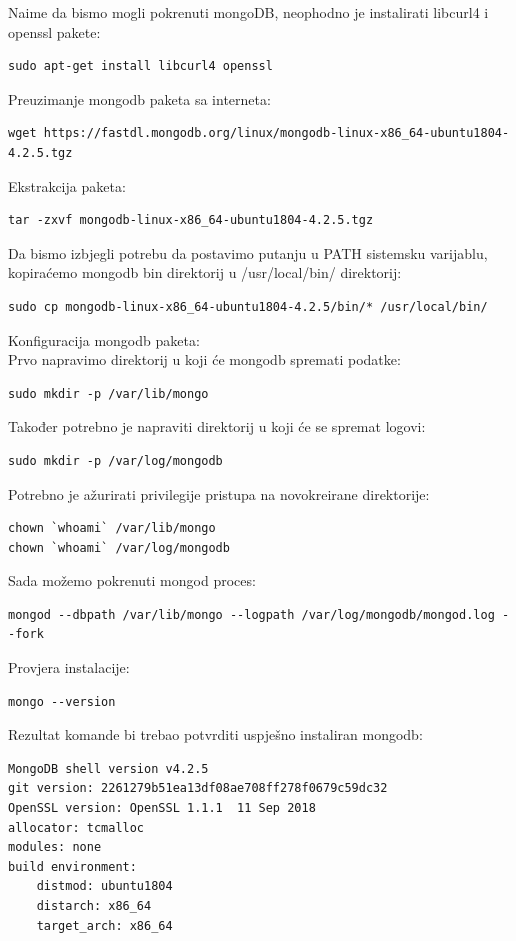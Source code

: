 \documentclass[12pt,vi]{mitthesis}
\begin{document}
\noindent
Naime da bismo mogli pokrenuti mongoDB, neophodno je instalirati libcurl4 i openssl pakete:
\begin{lstlisting}[style=BashInputStyle]
sudo apt-get install libcurl4 openssl
\end{lstlisting}
Preuzimanje mongodb paketa sa interneta:
\begin{lstlisting}[style=BashInputStyle]
wget https://fastdl.mongodb.org/linux/mongodb-linux-x86_64-ubuntu1804-4.2.5.tgz
\end{lstlisting}
Ekstrakcija paketa:
\begin{lstlisting}[style=BashInputStyle]
tar -zxvf mongodb-linux-x86_64-ubuntu1804-4.2.5.tgz
\end{lstlisting}
Da bismo izbjegli potrebu da postavimo putanju u PATH sistemsku varijablu, kopiraćemo mongodb bin direktorij u /usr/local/bin/ direktorij:
\begin{lstlisting}[style=BashInputStyle]
sudo cp mongodb-linux-x86_64-ubuntu1804-4.2.5/bin/* /usr/local/bin/
\end{lstlisting}
Konfiguracija mongodb paketa:\\
Prvo napravimo direktorij u koji će mongodb spremati podatke:
\begin{lstlisting}[style=BashInputStyle]
sudo mkdir -p /var/lib/mongo
\end{lstlisting}
Također potrebno je napraviti direktorij u koji će se spremat logovi:
\begin{lstlisting}[style=BashInputStyle]
sudo mkdir -p /var/log/mongodb
\end{lstlisting}
Potrebno je ažurirati privilegije pristupa na novokreirane direktorije:
\begin{lstlisting}[style=BashInputStyle]
chown `whoami` /var/lib/mongo 
chown `whoami` /var/log/mongodb
\end{lstlisting}
Sada možemo pokrenuti mongod proces:
\begin{lstlisting}[style=BashInputStyle]
mongod --dbpath /var/lib/mongo --logpath /var/log/mongodb/mongod.log --fork
\end{lstlisting}
Provjera instalacije:
\begin{lstlisting}[style=BashInputStyle]
mongo --version
\end{lstlisting}
Rezultat komande bi trebao potvrditi uspješno instaliran mongodb:
\begin{lstlisting}[style=BashInputStyle]
MongoDB shell version v4.2.5
git version: 2261279b51ea13df08ae708ff278f0679c59dc32
OpenSSL version: OpenSSL 1.1.1  11 Sep 2018
allocator: tcmalloc
modules: none
build environment:
    distmod: ubuntu1804
    distarch: x86_64
    target_arch: x86_64
\end{lstlisting}
\end{document}
